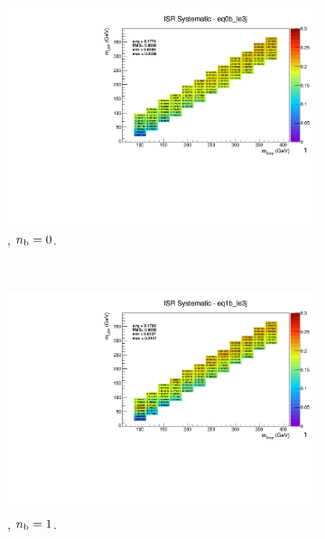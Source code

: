\begin{figure}[ht!]
\begin{subfigure}[b]{0.32\textwidth}
    \includegraphics[width=\textwidth, page=1]{Figs/sms/t2degen/v19/systs_v2/T2_4body_ISR_eq0b_le3j.pdf}
    \caption{\njlow, $n_{\text{b}} = 0$.}
  \end{subfigure}\\
  \begin{subfigure}[b]{0.32\textwidth}
    \includegraphics[width=\textwidth, page=12]{Figs/sms/t2degen/v19/systs_v2/T2_4body_ISR_eq1b_le3j.pdf}
    \caption{\njlow, $n_{\text{b}} = 1$.}
  \end{subfigure}
  \begin{subfigure}[b]{0.32\textwidth}

\end{subfigure}
\end{figure}
